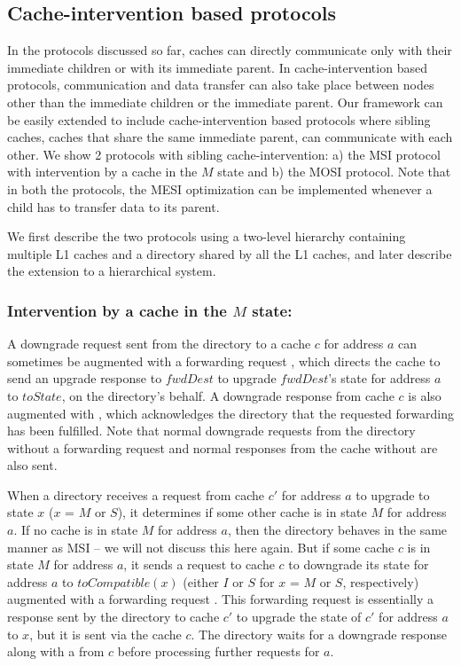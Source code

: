 \subsection{Cache-intervention based protocols}
In the protocols discussed so far, caches can directly communicate only with
their immediate children or with its immediate parent. In cache-intervention
based protocols, communication and data transfer can also take place between
nodes other than the immediate children or the immediate parent. Our framework
can be easily extended to include cache-intervention based protocols where
sibling caches, \ie caches that share the same immediate parent, can communicate
with each other. We show 2 protocols with sibling cache-intervention: a) the MSI
protocol with intervention by a cache in the $M$ state and b) the MOSI protocol. 
Note that in both the protocols, the MESI optimization can be implemented
whenever a child has to transfer data to its parent.

We first describe the two protocols using a two-level hierarchy containing
multiple L1 caches and a directory shared by all the L1 caches, and later
describe the extension to a hierarchical system.

\subsubsection{Intervention by a cache in the $M$ state:}
A downgrade request sent from the directory to a cache $c$ for address $a$ can
sometimes be augmented with a forwarding request ,
which directs the cache to send an upgrade response to $fwdDest$ to upgrade
$fwdDest$'s state for address $a$ to $toState$, on the directory's behalf. A
downgrade response from cache $c$ is also augmented with \FwdAck{}, which
acknowledges the directory that the requested forwarding has been fulfilled.
Note that normal downgrade requests from the directory without a forwarding
request and normal responses from the cache without \FwdAck{} are also sent.

When a directory receives a request from cache $c'$ for address $a$ to upgrade
to state $x$ ($x$ = $M$ or $S$), it determines if some other cache is in
state $M$ for address $a$. If no cache is in state $M$ for address $a$, then the
directory behaves in the same manner as MSI -- we will not discuss this here
again.  But if some cache $c$ is in state $M$ for address $a$, it sends a
request to cache $c$ to downgrade its state for address $a$ to $toCompatible(x)$
(either $I$ or $S$ for $x$ = $M$ or $S$, respectively) augmented with a
forwarding request . This forwarding request is essentially a
response sent by the directory to cache $c'$ to upgrade the state of $c'$ for
address $a$ to $x$, but it is sent via the cache $c$. The directory waits for a
downgrade response along with a \FwdAck{} from $c$ before processing further
requests for $a$.

